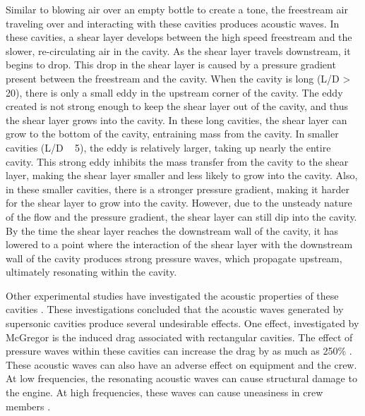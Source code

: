 Similar to blowing air over an empty bottle to create a tone, the freestream air traveling over and interacting with these cavities produces acoustic waves. In these cavities, a shear layer develops between the high speed freestream and the slower, re-circulating air in the cavity. As the shear layer travels downstream, it begins to drop. This drop in the shear layer is caused by a pressure gradient present between the freestream and the cavity. When the cavity is long (L/D > 20), there is only a small eddy in the upstream corner of the cavity. The eddy created is not strong enough to keep the shear layer out of the cavity, and thus the shear layer grows into the cavity. In these long cavities, the shear layer can grow to the bottom of the cavity, entraining mass from the cavity. In smaller cavities (L/D ~ 5), the eddy is relatively larger, taking up nearly the entire cavity. This strong eddy inhibits the mass transfer from the cavity to the shear layer, making the shear layer smaller and less likely to grow into the cavity. Also, in these smaller cavities, there is a stronger pressure gradient, making it harder for the shear layer to grow into the cavity. However, due to the unsteady nature of the flow and the pressure gradient, the shear layer can still dip into the cavity. By the time the shear layer reaches the downstream wall of the cavity, it has lowered to a point where the interaction of the shear layer with the downstream wall of the cavity produces strong pressure waves, which propagate upstream, ultimately resonating within the cavity. 

Other experimental studies have investigated the acoustic properties of these cavities \cite{unalmis2004cavity,heller1996letter,williams2007supersonic, mcgregor1970drag,luo2011drag, sato1999advanced}. These investigations concluded that the acoustic waves generated by supersonic cavities produce several undesirable effects. One effect, investigated by McGregor is the induced drag associated with rectangular cavities. The effect of pressure waves within these cavities can increase the drag by as much as 250\% \cite{mcgregor1970drag}. These acoustic waves can also have an adverse effect on equipment and the crew. At low frequencies, the resonating acoustic waves can cause structural damage to the engine. At high frequencies, these waves can cause uneasiness in crew members \cite{mcgregor1970drag}.

